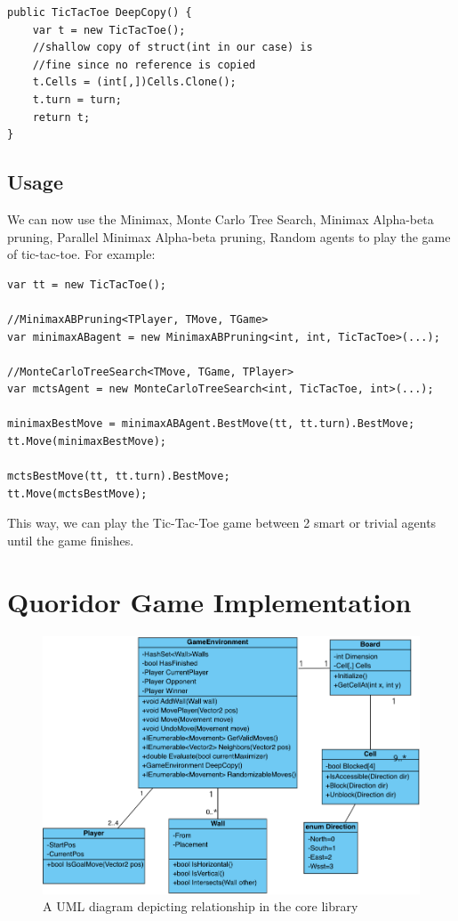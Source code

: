 \begin{lstlisting}
public TicTacToe DeepCopy() {
    var t = new TicTacToe();
    //shallow copy of struct(int in our case) is
    //fine since no reference is copied
    t.Cells = (int[,])Cells.Clone();
    t.turn = turn;
    return t;
}
\end{lstlisting}

\subsection{Usage}

We can now use the Minimax, Monte Carlo Tree Search, Minimax Alpha-beta pruning, Parallel Minimax Alpha-beta pruning, Random agents to play the game of tic-tac-toe. For example:

\begin{lstlisting}
var tt = new TicTacToe();

//MinimaxABPruning<TPlayer, TMove, TGame>
var minimaxABagent = new MinimaxABPruning<int, int, TicTacToe>(...);

//MonteCarloTreeSearch<TMove, TGame, TPlayer>
var mctsAgent = new MonteCarloTreeSearch<int, TicTacToe, int>(...);

minimaxBestMove = minimaxABAgent.BestMove(tt, tt.turn).BestMove;
tt.Move(minimaxBestMove);

mctsBestMove(tt, tt.turn).BestMove;
tt.Move(mctsBestMove);
\end{lstlisting}

This way, we can play the Tic-Tac-Toe game between 2 smart or trivial agents until the game finishes.

\section{Quoridor Game Implementation}\label{sec:gameimplementation}

\begin{figure}[!ht]
    \centering
    \includegraphics[width=.95\linewidth]{../img/uml_core.png}
    \caption{A UML diagram depicting relationship in the core library}
    \label{fig:core_uml}
\end{figure}

